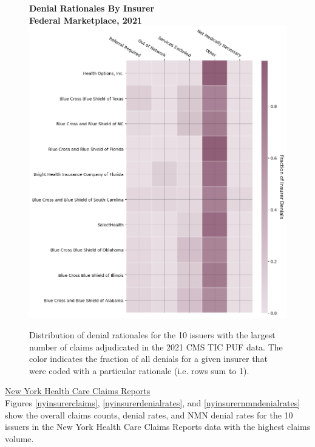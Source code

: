 \documentclass[12pt, a4paper,twoside,parskip=full]{report}
\theoremstyle{plain} %
\theoremstyle{definition} %
\theoremstyle{remark} %
\numberwithin{equation}{chapter}
\begin{document}
		\begin{figure}[h!]
			\centering
			\textbf{Denial Rationales By Insurer}\\
			\textbf{Federal Marketplace, 2021}\\
			\includegraphics[width=\columnwidth]{images/cms_puf/insurer_vs_denial_cat.png}
			\caption{Distribution of denial rationales for the 10 issuers with the largest number of claims adjudicated in the 2021 CMS TIC PUF data. The color indicates the fraction of all denials for a given insurer that were coded with a particular rationale (i.e. rows sum to 1). }
			\label{feddenialrationalesbyinsurer}
		\end{figure}
	
		\clearpage
		
		
		
		\underline{New York Health Care Claims Reports}\\
		
				Figures \ref{nyinsurerclaims}, \ref{nyinsurerdenialrates}, and \ref{nyinsurernmndenialrates} show the overall claims counts, denial rates, and NMN denial rates for the 10 issuers in the New York Health Care Claims Reports data with the highest claims volume.
		
\end{document}
